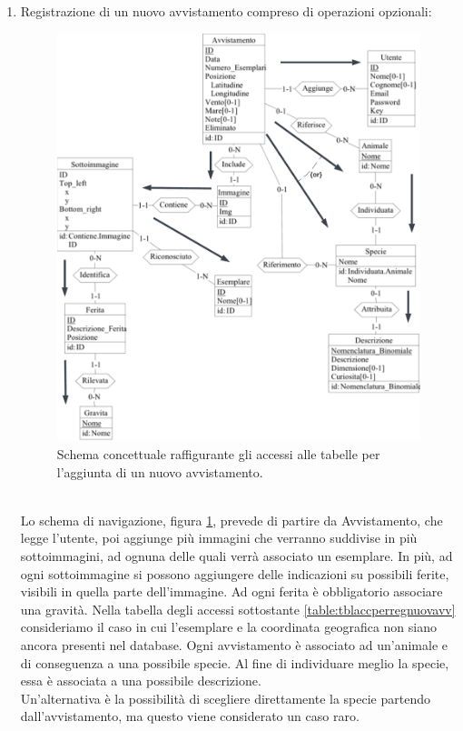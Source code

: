 \documentclass[a4paper,final,12pt]{report}
\begin{document}
\begin{enumerate}
\newpage
\item Registrazione di un nuovo avvistamento compreso di operazioni opzionali:
\begin{figure}[hbtp]
\centering
\includegraphics[scale=0.20]{img_concettuale/Avvistamento_accessi.png}
\caption{Schema concettuale raffigurante gli accessi alle tabelle per l'aggiunta di un nuovo avvistamento.}
\label{figura:regnuovavvopopzio}
\end{figure}\\
Lo schema di navigazione, figura \ref{figura:regnuovavvopopzio}, prevede di partire da Avvistamento, che legge l'utente, poi aggiunge più immagini che verranno suddivise in più sottoimmagini, ad ognuna delle quali verrà associato un esemplare. In più, ad ogni sottoimmagine si possono aggiungere delle indicazioni su possibili ferite, visibili in quella parte dell'immagine. Ad ogni ferita è obbligatorio associare una gravità. Nella tabella degli accessi sottostante \ref{table:tblaccperregnuovavv} consideriamo il caso in cui l'esemplare e la coordinata geografica non siano ancora presenti nel database. Ogni avvistamento è associato ad un'animale e di conseguenza a una possibile specie. Al fine di individuare meglio la specie, essa è associata a una possibile descrizione.\\ Un'alternativa è la possibilità di scegliere direttamente la specie partendo dall'avvistamento, ma questo viene considerato un caso raro.

\end{enumerate}
\end{document}
